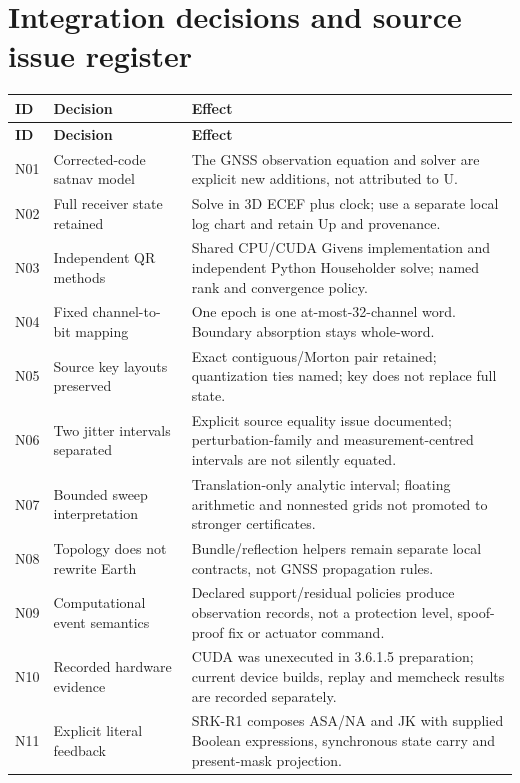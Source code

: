 \documentclass[11pt,a4paper]{article}
\begin{document}
\section{Integration decisions and source issue register}
\small
\begin{longtable}{@{}P{.075\textwidth}P{.28\textwidth}P{.575\textwidth}@{}}\toprule
\textbf{ID} & \textbf{Decision} & \textbf{Effect}\\\midrule
\endfirsthead
\toprule\textbf{ID} & \textbf{Decision} & \textbf{Effect}\\\midrule\endhead
N01 & Corrected-code satnav model & The GNSS observation equation and solver are explicit new additions, not attributed to U.\\
N02 & Full receiver state retained & Solve in 3D ECEF plus clock; use a separate local log chart and retain Up and provenance.\\
N03 & Independent QR methods & Shared CPU/CUDA Givens implementation and independent Python Householder solve; named rank and convergence policy.\\
N04 & Fixed channel-to-bit mapping & One epoch is one at-most-32-channel word. Boundary absorption stays whole-word.\\
N05 & Source key layouts preserved & Exact contiguous/Morton pair retained; quantization ties named; key does not replace full state.\\
N06 & Two jitter intervals separated & Explicit source equality issue documented; perturbation-family and measurement-centred intervals are not silently equated.\\
N07 & Bounded sweep interpretation & Translation-only analytic interval; floating arithmetic and nonnested grids not promoted to stronger certificates.\\
N08 & Topology does not rewrite Earth & Bundle/reflection helpers remain separate local contracts, not GNSS propagation rules.\\
N09 & Computational event semantics & Declared support/residual policies produce observation records, not a protection level, spoof-proof fix or actuator command.\\
N10 & Recorded hardware evidence & CUDA was unexecuted in 3.6.1.5 preparation; current device builds, replay and memcheck results are recorded separately.\\
N11 & Explicit literal feedback & SRK-R1 composes ASA/NA and JK with supplied Boolean expressions, synchronous state carry and present-mask projection.\\\bottomrule
\end{longtable}
\normalsize
\end{document}
